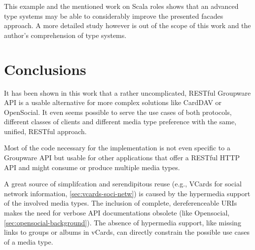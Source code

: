 \documentclass[11pt,a4paper,headsepline,twoside]{scrartcl}		%
\begin{document}
This example and the mentioned work on Scala roles shows that an advanced type
systems may be able to considerably improve the presented facades approach. A
more detailed study however is out of the scope of this work and the author's
comprehension of type systems.

\section{Conclusions}
\label{sec:conclusions}



It has been shown in this work that a rather uncomplicated, RESTful Groupware
API is a usable alternative for more complex solutions like CardDAV or
OpenSocial. It even seems possible to serve the use cases of both protocols,
different classes of clients and different media type preference with the same,
unified, RESTful approach.

Most of the code necessary for the implementation is not even specific to a
Groupware API but usable for other applications that offer a RESTful HTTP API
and might consume or produce multiple media types.

A great source of simplifcation and serendipitous reuse (e.g., VCards for social
network information, \autoref{sec:vcards-soci-netw}) is caused by the hypermedia
support of the involved media types.  The inclusion of complete, dereferenceable
URIs makes the need for verbose API documentations obsolete (like Opensocial,
\autoref{sec:opensocial-background}). The absence of hypermedia support, like
missing links to groups or albums in vCards, can directly constrain the possible
use cases of a media type.
\end{document}
